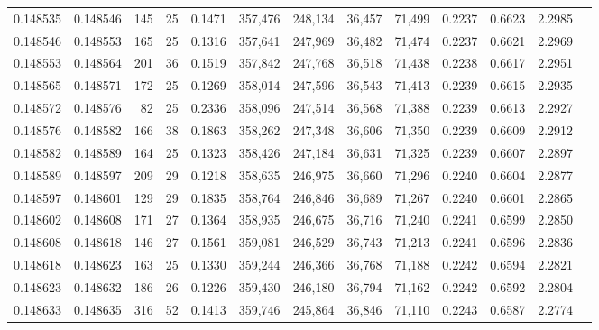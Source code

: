 \begin{tabular}{rrrrrrrrrrrrr}
0.148535 & 0.148546 & 145 &  25 &                                     0.1471 & 357,476 & 248,134 &  36,457 &  71,499 & 0.2237 & 0.6623 & 2.2985 \\
0.148546 & 0.148553 & 165 &  25 &                                     0.1316 & 357,641 & 247,969 &  36,482 &  71,474 & 0.2237 & 0.6621 & 2.2969 \\
0.148553 & 0.148564 & 201 &  36 &                                     0.1519 & 357,842 & 247,768 &  36,518 &  71,438 & 0.2238 & 0.6617 & 2.2951 \\
0.148565 & 0.148571 & 172 &  25 &                                     0.1269 & 358,014 & 247,596 &  36,543 &  71,413 & 0.2239 & 0.6615 & 2.2935 \\
0.148572 & 0.148576 &  82 &  25 &                                     0.2336 & 358,096 & 247,514 &  36,568 &  71,388 & 0.2239 & 0.6613 & 2.2927 \\
0.148576 & 0.148582 & 166 &  38 &                                     0.1863 & 358,262 & 247,348 &  36,606 &  71,350 & 0.2239 & 0.6609 & 2.2912 \\
0.148582 & 0.148589 & 164 &  25 &                                     0.1323 & 358,426 & 247,184 &  36,631 &  71,325 & 0.2239 & 0.6607 & 2.2897 \\
0.148589 & 0.148597 & 209 &  29 &                                     0.1218 & 358,635 & 246,975 &  36,660 &  71,296 & 0.2240 & 0.6604 & 2.2877 \\
0.148597 & 0.148601 & 129 &  29 &                                     0.1835 & 358,764 & 246,846 &  36,689 &  71,267 & 0.2240 & 0.6601 & 2.2865 \\
0.148602 & 0.148608 & 171 &  27 &                                     0.1364 & 358,935 & 246,675 &  36,716 &  71,240 & 0.2241 & 0.6599 & 2.2850 \\
0.148608 & 0.148618 & 146 &  27 &                                     0.1561 & 359,081 & 246,529 &  36,743 &  71,213 & 0.2241 & 0.6596 & 2.2836 \\
0.148618 & 0.148623 & 163 &  25 &                                     0.1330 & 359,244 & 246,366 &  36,768 &  71,188 & 0.2242 & 0.6594 & 2.2821 \\
0.148623 & 0.148632 & 186 &  26 &                                     0.1226 & 359,430 & 246,180 &  36,794 &  71,162 & 0.2242 & 0.6592 & 2.2804 \\
0.148633 & 0.148635 & 316 &  52 &                                     0.1413 & 359,746 & 245,864 &  36,846 &  71,110 & 0.2243 & 0.6587 & 2.2774 \\

\end{tabular}

